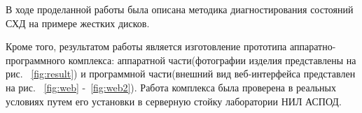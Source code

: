 \conclusion

В ходе проделанной работы была описана методика диагностирования состояний СХД на примере жестких дисков.

Кроме того, результатом работы является изготовление прототипа аппаратно-программного комплекса: аппаратной части(фотографии изделия представлены на рис. ~\ref{fig:result}) и программной части(внешний вид веб-интерфейса представлен на рис. ~\ref{fig:web} -~\ref{fig:web2}). Работа комплекса была проверена в реальных условиях путем его установки в серверную стойку лаборатории НИЛ АСПОД. 
